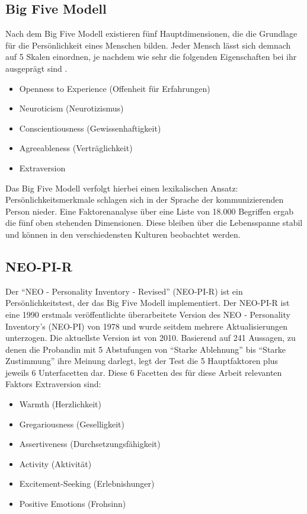 \subsection{Big Five Modell}

Nach dem Big Five Modell existieren fünf Hauptdimensionen, die die Grundlage für die Persönlichkeit eines Menschen bilden.
Jeder Mensch lässt sich demnach auf 5 Skalen einordnen, je nachdem wie sehr die folgenden Eigenschaften bei ihr ausgeprägt sind \cite{john1999big}.

\begin{itemize}
  \item Openness to Experience (Offenheit für Erfahrungen)
  \item Neuroticism (Neurotizismus)
  \item Conscientiousness (Gewissenhaftigkeit)
  \item Agreeableness (Verträglichkeit)
  \item Extraversion
\end{itemize}

Das Big Five Modell verfolgt hierbei einen lexikalischen Ansatz: 
Persönlichkeitsmerkmale schlagen sich in der Sprache der kommunizierenden Person nieder.
Eine Faktorenanalyse über eine Liste von 18.000 Begriffen ergab die fünf oben stehenden Dimensionen.
Diese bleiben über die Lebensspanne stabil und können in den verschiedensten Kulturen beobachtet werden.

\subsection{NEO-PI-R}

Der "`NEO - Personality Inventory - Revised"' (NEO-PI-R) ist ein Persönlichkeitstest, der das Big Five Modell implementiert.
Der NEO-PI-R ist eine 1990 erstmals veröffentlichte überarbeitete Version des NEO - Personality Inventory's (NEO-PI) von 1978 und wurde seitdem mehrere Aktualisierungen unterzogen. Die aktuellste Version ist von 2010.
Basierend auf 241 Aussagen, zu denen die Probandin mit 5 Abstufungen von "`Starke Ablehnung"' bis "`Starke Zustimmung"' ihre Meinung darlegt, legt der Test die 5 Hauptfaktoren plus jeweils 6 Unterfacetten dar.
Diese 6 Facetten des für diese Arbeit relevanten Faktors Extraversion sind:

\begin{itemize}
  \item Warmth (Herzlichkeit)
  \item Gregariousness (Geselligkeit)
  \item Assertiveness (Durchsetzungsfähigkeit)
  \item Activity (Aktivität)
  \item Excitement-Seeking (Erlebnishunger)
  \item Positive Emotions (Frohsinn)
\end{itemize}

